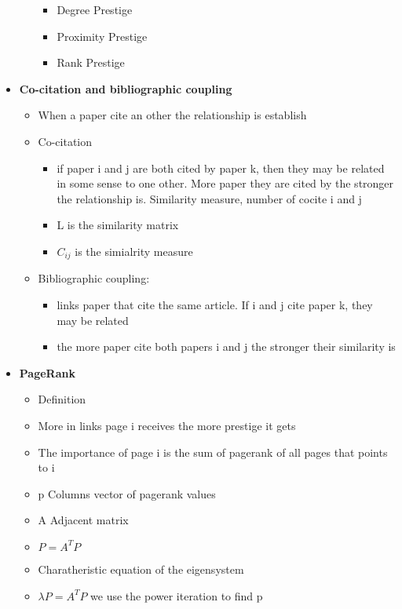 \begin{itemize}
\begin{itemize}
\begin{itemize}
            \item Degree Prestige
            \item Proximity Prestige
            \item Rank Prestige
        \end{itemize}
    \end{itemize}
    \item \textbf{Co-citation and bibliographic coupling}
    \begin{itemize}
        \item When a paper cite an other the relationship is establish
        \item Co-citation
        \begin{itemize}
            \item if paper i and j are both cited by paper k, then they may be related in some sense to one other. More paper they are cited by the stronger the relationship is. Similarity measure, number of cocite i and j
            \item L is the similarity matrix
            \item \(C_{ij}\) is the simialrity measure
        \end{itemize}
        \item Bibliographic coupling:
        \begin{itemize}
            \item links paper that cite the same article. If i and j cite paper k, they may be related
            \item the more paper cite both papers i and j the stronger their similarity is 
        \end{itemize}
    \end{itemize}
    \item \textbf{PageRank}
    \begin{itemize}
        \item Definition
        \item More in links page i receives the more prestige it gets
        \item The importance of page i is the sum of pagerank of all pages that points to i 
        \item p Columns vector of pagerank values
        \item A Adjacent matrix
        \item \(P = A^T P\)
        \item Charatheristic equation of the eigensystem
        \item \(\lambda P = A^T P\) we use the power iteration to find p

\end{itemize}
\end{itemize}
